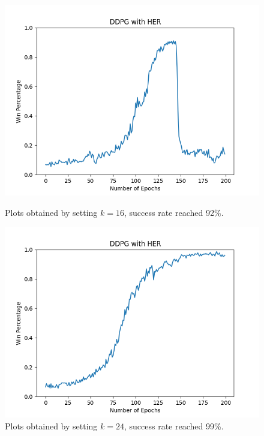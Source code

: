 \documentclass[a4paper]{report}
\begin{document}
\begin{figure}[h!]
\begin{minipage}[b]{0.47\textwidth}
\includegraphics[width=\textwidth]{k16.png}
\caption{\label{k16}Plots obtained by setting $k=16$, success rate reached 92\%.}
\end{minipage}
\hfill
\begin{minipage}[b]{0.47\textwidth}
\centering
\includegraphics[width=\textwidth]{k24.png}
\caption{\label{k24}Plots obtained by setting $k=24$, success rate reached 99\%.}
\end{minipage}
\end{figure}
\end{document}
